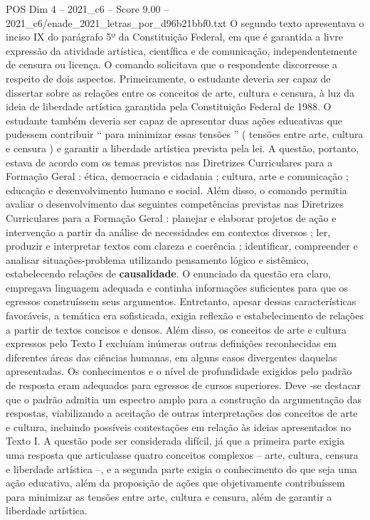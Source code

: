 \begin{textsample}{POS Dim 4 – 2021\_c6 – Score 9.00 – 2021\_c6/enade\_2021\_letras\_por\_d96b21bbf0.txt}
O segundo texto apresentava o inciso IX do parágrafo 5º da Constituição Federal, em que é garantida a livre expressão da atividade artística, científica e de comunicação, independentemente de censura ou licença.
O comando solicitava que o respondente discorresse a respeito de dois aspectos.
Primeiramente, o estudante deveria ser capaz de dissertar sobre as relações entre os conceitos de arte, cultura e censura, à luz da ideia de liberdade artística garantida pela Constituição Federal de 1988.
O estudante também deveria ser capaz de apresentar duas ações educativas que pudessem contribuir “ para minimizar essas tensões ” ( tensões entre arte, cultura e censura ) e garantir a liberdade artística prevista pela lei.
A questão, portanto, estava de acordo com os temas previstos nas Diretrizes Curriculares para a Formação Geral : ética, democracia e cidadania ; cultura, arte e comunicação ; educação e desenvolvimento humano e social.
Além disso, o comando permitia avaliar o desenvolvimento das seguintes competências previstas nas Diretrizes Curriculares para a Formação Geral : planejar e elaborar projetos de ação e intervenção a partir da análise de necessidades em contextos diversos ; ler, produzir e interpretar textos com clareza e coerência ; identificar, compreender e analisar situações-problema utilizando pensamento lógico e sistêmico, estabelecendo relações de \textbf{causalidade}.
O enunciado da questão era claro, empregava linguagem adequada e continha informações suficientes para que os egressos construíssem seus argumentos.
Entretanto, apesar dessas características favoráveis, a temática era sofisticada, exigia reflexão e estabelecimento de relações a partir de textos concisos e densos.
Além disso, os conceitos de arte e cultura expressos pelo Texto I excluíam inúmeras outras definições reconhecidas em diferentes áreas das ciências humanas, em alguns casos divergentes daquelas apresentadas.
Os conhecimentos e o nível de profundidade exigidos pelo padrão de resposta eram adequados para egressos de cursos superiores.
Deve -se destacar que o padrão admitia um espectro amplo para a construção da argumentação das respostas, viabilizando a aceitação de outras interpretações dos conceitos de arte e cultura, incluindo possíveis contestações em relação às ideias apresentados no Texto I.
A questão pode ser considerada difícil, já que a primeira parte exigia uma resposta que articulasse quatro conceitos complexos – arte, cultura, censura e liberdade artística –, e a segunda parte exigia o conhecimento do que seja uma ação educativa, além da proposição de ações que objetivamente contribuíssem para minimizar as tensões entre arte, cultura e censura, além de garantir a liberdade artística.

\end{textsample}
